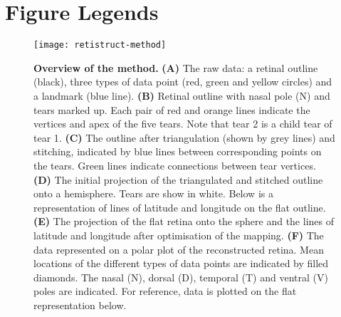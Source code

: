 \documentclass[10pt]{article}
\begin{document}
\newcommand{\myshortjournaltitles}{}

%

\section*{Figure Legends}

\begin{figure}[!ht]
  \texttt{[image: retistruct-method]}
  
  \vspace*{-4.54in}

  \mbox{}

  \vspace*{2.27in}

  \caption{\textbf{Overview of the method.} \textbf{(A)} The raw data:
    a retinal outline (black), three types of data point (red, green
    and yellow circles) and a landmark (blue line). \textbf{(B)}
    Retinal outline with nasal pole (N) and tears marked up. Each
    pair of red and orange lines indicate the vertices and apex of the
    five tears. Note that tear 2 is a child tear of tear 1. \textbf{(C)}
    The outline after triangulation (shown by grey lines) and
    stitching, indicated by blue lines between corresponding points
    on the tears. Green lines indicate connections between tear
    vertices.  \textbf{(D)} The initial projection of the triangulated
    and stitched outline onto a hemisphere. Tears are show in
    white. Below is a representation of lines of latitude and
    longitude on the flat outline. \textbf{(E)} The projection of the
    flat retina onto the sphere and the lines of latitude and
    longitude after optimisation of the mapping. \textbf{(F)} The data
    represented on a polar plot of the reconstructed retina. Mean
    locations of the different types of data points are indicated by
    filled diamonds. The nasal (N), dorsal (D), temporal (T) and
    ventral (V) poles are indicated. For reference, data is plotted on
    the flat representation below. }
  \label{fold-sphere:fig:method}
\end{figure}
\end{document}
